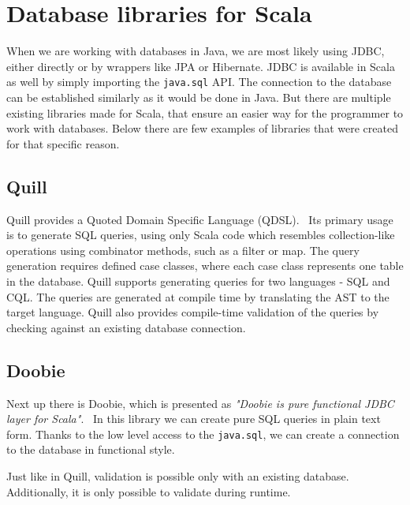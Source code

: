 \section{Database libraries for Scala}
When we are working with databases in Java, we are most likely using JDBC, either directly or by wrappers like JPA or Hibernate. JDBC is available in Scala as well by simply importing the \texttt{java.sql} API. The connection to the database can be established similarly as it would be done in Java. But there are multiple existing libraries made for Scala, that ensure an easier way for the programmer to work with databases. Below there are few examples of libraries that were created for that specific reason.

\subsection{Quill}
Quill provides a Quoted Domain Specific Language (QDSL).~\cite{Quill} Its primary usage is to generate SQL queries, using only Scala code which resembles collection-like operations using combinator methods, such as a filter or map. The query generation requires defined case classes, where each case class represents one table in the database. Quill supports generating queries for two languages - SQL and CQL. The queries are generated at compile time by translating the AST to the target language. Quill also provides compile-time validation of the queries by checking against an existing database connection.

\subsection{Doobie}
Next up there is Doobie, which is presented as \textit{"Doobie is pure functional JDBC layer for Scala"}.~\cite{Doobie} In this library we can create pure SQL queries in plain text form. Thanks to the low level access to the \texttt{java.sql}, we can create a connection to the database in functional style. 

Just like in Quill, validation is possible only with an existing database. Additionally, it is only possible to validate during runtime.

